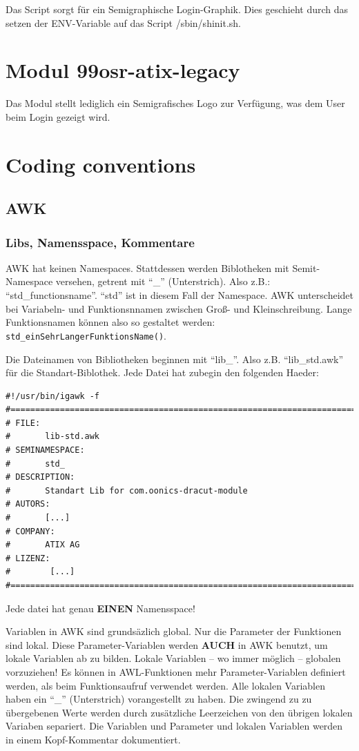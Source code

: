 \documentclass[10pt,a4paper]{article}
\begin{document}
Das Script sorgt für ein Semigraphische Login-Graphik. Dies geschieht durch das setzen der ENV-Variable auf das Script /sbin/shinit.sh.

\section{Modul 99osr-atix-legacy}

Das Modul stellt lediglich ein Semigrafisches Logo zur Verfügung, was dem User beim Login gezeigt wird.

\section{Coding conventions}

\subsection{AWK}

\subsubsection{Libs, Namensspace, Kommentare}

AWK hat keinen Namespaces. Stattdessen werden Biblotheken mit Semit-Namespace versehen, getrent mit "`\_"' (Unterstrich). Also z.B.: "`std\_functionsname"'. "`std"' ist in diesem Fall der Namespace. AWK unterscheidet bei Variabeln- und Funktionsnnamen zwischen Groß- und Kleinschreibung. Lange Funktionsnamen können also so gestaltet werden: \texttt{std\_einSehrLangerFunktionsName()}.


Die Dateinamen von Bibliotheken beginnen mit "`lib\_"'. Also z.B. "`lib\_std.awk"' für die Standart-Biblothek. Jede Datei hat zubegin den folgenden Haeder:

\begin{lstlisting}
#!/usr/bin/igawk -f
#==============================================================================
# FILE:
#       lib-std.awk
# SEMINAMESPACE:
#       std_
# DESCRIPTION:
#       Standart Lib for com.oonics-dracut-module
# AUTORS:
#       [...]
# COMPANY:
#       ATIX AG
# LIZENZ:
#        [...]
#==============================================================================
\end{lstlisting}
Jede datei hat genau \textbf{EINEN} Namensspace!


\bigskip 


Variablen in AWK sind grundsäzlich global. Nur die Parameter der Funktionen sind lokal. Diese Parameter-Variablen werden \textbf{AUCH} in AWK benutzt, um lokale Variablen ab zu bilden. Lokale Variablen -- wo immer möglich -- globalen vorzuziehen! Es können in AWL-Funktionen mehr Parameter-Variablen definiert werden, als beim Funktionsaufruf verwendet werden. Alle lokalen Variablen haben ein  "`\_"' (Unterstrich) vorangestellt zu haben. Die zwingend zu zu übergebenen Werte werden durch zusätzliche Leerzeichen von den übrigen lokalen Variaben separiert. Die Variablen und Parameter und lokalen Variablen werden in einem Kopf-Kommentar dokumentiert.
\end{document}
